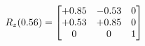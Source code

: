 \documentclass[preview]{standalone}
\begin{document}
\begin{align*}
\special{dvisvgm:raw <g id='unique000'>}R_{z}(0.56) = \begin{bmatrix}+0.85 & -0.53 & 0 \\+0.53 & +0.85 & 0 \\0 & 0 & 1\end{bmatrix}\special{dvisvgm:raw </g>}
\end{align*}
\end{document}
